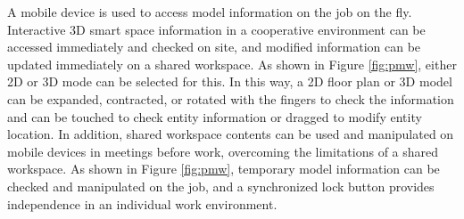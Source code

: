 

A mobile device is used to access model information on the job on the fly. Interactive 3D smart space information in a cooperative environment can be accessed immediately and checked on site, and modified information can be updated immediately on a shared workspace. As shown in Figure \ref{fig:pmw}, either 2D or 3D mode can be selected for this. In this way, a 2D floor plan or 3D model can be expanded, contracted, or rotated with the fingers to check the information and can be touched to check entity information or dragged to modify entity location. In addition, shared workspace contents can be used and manipulated on mobile devices in meetings before work, overcoming the limitations of a shared workspace. As shown in Figure \ref{fig:pmw}, temporary model information can be checked and manipulated on the job, and a synchronized lock button provides independence in an individual work environment.

%

%
